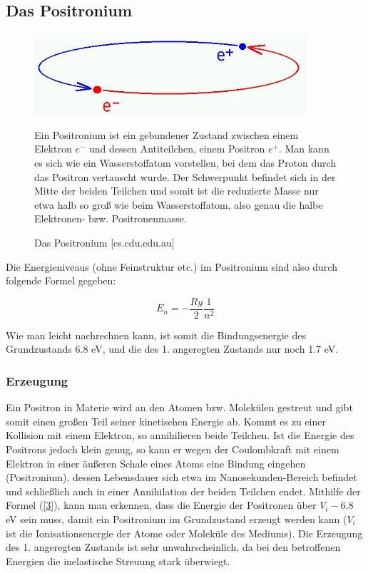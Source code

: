 \subsection{Das Positronium \label{1}}

\begin{figure}[H]
	\begin{minipage}{0.5\textwidth}
	\centering \includegraphics[width=0.9\textwidth]{BilderTheorie/Positronium.png}
	\caption{Das Positronium [cs.cdu.edu.au]}
	\end{minipage}
	\begin{minipage}{0.5\textwidth}
	Ein Positronium ist ein gebundener Zustand zwischen einem Elektron $e^-$ und dessen Antiteilchen, einem Positron $e^+$. Man kann es sich wie ein Wasserstoffatom vorstellen, bei dem das Proton durch das Positron vertauscht wurde. Der Schwerpunkt befindet sich in der Mitte der beiden Teilchen und somit ist die reduzierte Masse nur etwa halb so groß wie beim Wasserstoffatom, also genau die halbe Elektronen- bzw. Positronenmasse.
	\end{minipage}
\end{figure}
Die Energieniveaus (ohne Feinstruktur etc.) im Positronium sind also durch folgende Formel gegeben:

\begin{equation} E_n = -\frac{Ry}{2}\frac{1}{n^2} \label{3} \end{equation}

Wie man leicht nachrechnen kann, ist somit die Bindungsenergie des Grundzustands 6.8 eV, und die des 1. angeregten Zustands nur noch 1.7 eV.

\subsubsection{Erzeugung}

Ein Positron in Materie wird an den Atomen bzw. Molekülen gestreut und gibt somit einen großen Teil seiner kinetischen Energie ab. Kommt es zu einer Kollision mit einem Elektron, so annihilieren beide Teilchen. Ist die Energie des Positrons jedoch klein genug, so kann er wegen der Coulombkraft mit einem Elektron in einer äußeren Schale eines Atoms eine Bindung eingehen (Positronium), dessen Lebensdauer sich etwa im Nanosekunden-Bereich befindet und schließlich auch in einer Annihilation der beiden Teilchen endet. Mithilfe der Formel (\ref{3}), kann man erkennen, dass die Energie der Positronen über $V_i - 6.8$ eV sein muss, damit ein Positronium im Grundzustand erzeugt werden kann ($V_i$ ist die Ionisationsenergie der Atome oder Moleküle des Mediums). Die Erzeugung des 1. angeregten Zustands ist sehr unwahrscheinlich, da bei den betroffenen Energien die inelastische Streuung stark überwiegt. 

